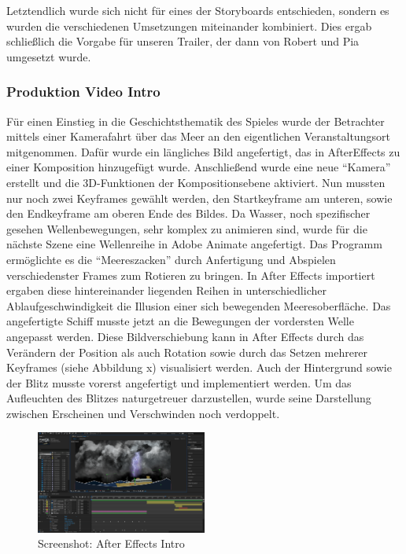 Letztendlich wurde sich nicht für eines der Storyboards entschieden, sondern es wurden die verschiedenen Umsetzungen miteinander kombiniert. Dies ergab schließlich die Vorgabe für unseren Trailer, der dann von Robert und Pia umgesetzt wurde.


\subsubsection{Produktion Video Intro}
Für einen Einstieg in die Geschichtsthematik des Spieles wurde der Betrachter mittels einer Kamerafahrt über das Meer an den eigentlichen Veranstaltungsort mitgenommen.
Dafür wurde ein längliches Bild angefertigt, das in AfterEffects zu einer Komposition hinzugefügt wurde. Anschließend wurde eine neue “Kamera” erstellt und die 3D-Funktionen der Kompositionsebene aktiviert. Nun mussten nur noch zwei Keyframes gewählt werden, den Startkeyframe am unteren, sowie den Endkeyframe am oberen Ende des Bildes.
Da Wasser, noch spezifischer gesehen Wellenbewegungen, sehr komplex zu animieren sind, wurde für die nächste Szene eine Wellenreihe in Adobe Animate angefertigt. Das Programm ermöglichte es die “Meereszacken” durch Anfertigung und Abspielen verschiedenster Frames zum Rotieren zu bringen. In After Effects importiert ergaben diese hintereinander liegenden Reihen in unterschiedlicher Ablaufgeschwindigkeit die Illusion einer sich bewegenden Meeresoberfläche. 
Das angefertigte Schiff musste jetzt an die Bewegungen der vordersten Welle angepasst werden. Diese Bildverschiebung kann in After Effects durch das Verändern der Position als auch Rotation sowie durch das Setzen mehrerer Keyframes (siehe Abbildung x) visualisiert werden. Auch der Hintergrund sowie der Blitz musste vorerst angefertigt und implementiert werden. Um das Aufleuchten des Blitzes naturgetreuer darzustellen, wurde seine Darstellung zwischen Erscheinen und Verschwinden noch verdoppelt. 

\begin{figure}
\includegraphics[width=0.5\textwidth]{../img/screenshot_aftereffects_intro.PNG}
\caption{Screenshot: After Effects Intro}
\label{fig:Screenshot: After Effects Intro}
\end{figure}